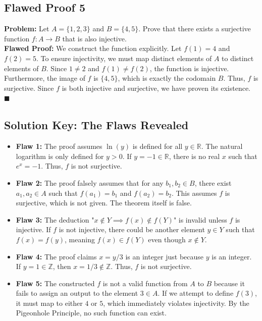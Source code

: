\documentclass[11pt, a4paper]{article}
\theoremstyle{definition}
\theoremstyle{remark}
\newcommand{\R}{\mathbb{R}}
\newcommand{\Z}{\mathbb{Z}}
\begin{document}
\subsection{Flawed Proof 5}
\textbf{Problem:} Let $A = \{1, 2, 3\}$ and $B = \{4, 5\}$. Prove that there exists a surjective function $f: A \to B$ that is also injective. \\
\textbf{Flawed Proof:} We construct the function explicitly. Let $f(1) = 4$ and $f(2) = 5$. To ensure injectivity, we must map distinct elements of $A$ to distinct elements of $B$. Since $1 \neq 2$ and $f(1) \neq f(2)$, the function is injective. Furthermore, the image of $f$ is $\{4, 5\}$, which is exactly the codomain $B$. Thus, $f$ is surjective. Since $f$ is both injective and surjective, we have proven its existence. $\blacksquare$

\vspace{1cm}
\subsection{Solution Key: The Flaws Revealed}
\begin{itemize}
    \item \textbf{Flaw 1:} The proof assumes $\ln(y)$ is defined for all $y \in \R$. The natural logarithm is only defined for $y > 0$. If $y = -1 \in \R$, there is no real $x$ such that $e^x = -1$. Thus, $f$ is not surjective.
    \item \textbf{Flaw 2:} The proof falsely assumes that for any $b_1, b_2 \in B$, there exist $a_1, a_2 \in A$ such that $f(a_1) = b_1$ and $f(a_2) = b_2$. This assumes $f$ is surjective, which is not given. The theorem itself is false.
    \item \textbf{Flaw 3:} The deduction "$x \notin Y \implies f(x) \notin f(Y)$" is invalid unless $f$ is injective. If $f$ is not injective, there could be another element $y \in Y$ such that $f(x) = f(y)$, meaning $f(x) \in f(Y)$ even though $x \notin Y$.
    \item \textbf{Flaw 4:} The proof claims $x = y/3$ is an integer just because $y$ is an integer. If $y = 1 \in \Z$, then $x = 1/3 \notin \Z$. Thus, $f$ is not surjective.
    \item \textbf{Flaw 5:} The constructed $f$ is not a valid function from $A$ to $B$ because it fails to assign an output to the element $3 \in A$. If we attempt to define $f(3)$, it must map to either $4$ or $5$, which immediately violates injectivity. By the Pigeonhole Principle, no such function can exist.
\end{itemize}
\end{document}
